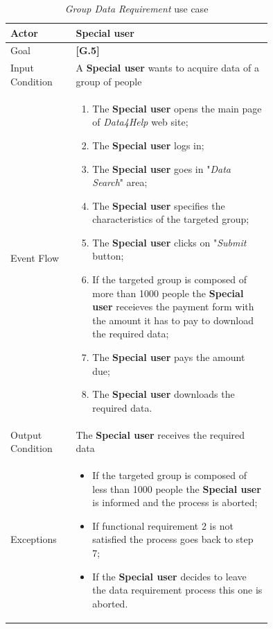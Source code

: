 \begin{center}
\begin{table}[H]
\begin{tabular}{ | l | p{0.75\linewidth} | }
  \hline
    Actor & \textbf{Special user}\\ \hline
    Goal & \textbf{[G.5]} \\ \hline
    Input Condition & A \textbf{Special user} wants to acquire data of a group of people \\ \hline
    Event Flow & \begin{minipage}[t]{0.7\textwidth}
      \begin{enumerate}
        \item The \textbf{Special user} opens the main page of \textit{Data4Help} web site;
        \item The \textbf{Special user} logs in;
        \item The \textbf{Special user} goes in "\textit{Data Search}" area;
        \item The \textbf{Special user} specifies the characteristics of the targeted group;
        \item The \textbf{Special user} clicks on "\textit{Submit} button;
        \item If the targeted group is composed of more than 1000 people the \textbf{Special user} receieves the payment form with the amount it has to pay to download the required data;
        \item The \textbf{Special user} pays the amount due;
        \item The \textbf{Special user} downloads the required data.
      \end{enumerate}
    \smallskip
  \end{minipage} \\ \hline
  Output Condition & The \textbf{Special user} receives the required data \\ \hline
  Exceptions & \begin{minipage}[t]{0.7\textwidth}
    \begin{itemize}
      \smallskip
      \item If the targeted group is composed of less than 1000 people the \textbf{Special user} is informed and the process is aborted;
      \item If functional requirement 2 is not satisfied the process goes back to step 7;
      \item If the \textbf{Special user} decides to leave the data requirement process this one is aborted.
    \end{itemize}
    \smallskip
  \end{minipage}  \\ \hline
\end{tabular}
\caption{\textit{Group Data Requirement} use case}
\label{table:groupDataRequirement}
\end{table}
\end{center}

